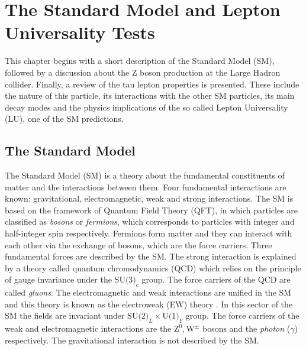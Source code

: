 \chapter{The Standard Model and Lepton Universality Tests}\label{chap:relatedwork}
This chapter begins with a short description of the Standard Model (SM), followed by a discussion about the Z boson production at the Large Hadron collider. Finally, a review of the tau lepton properties is presented. These include the nature of this particle, its interactions with the other SM particles, its main decay modes and the physics implications of the so called Lepton Universality (LU), one of the SM predictions.  
\section{The Standard Model}\label{chap2secm1}
The Standard Model (SM) is a theory about the fundamental constituents of matter and the interactions between them. Four fundamental interactions are known: gravitational, electromagnetic, weak and strong interactions. The SM is based on the framework of Quantum Field Theory (QFT), in which particles are classified as \textit{bosons} or \textit{fermions}, which corresponds to particles with integer and half-integer spin respectively. Fermions form matter and they can interact with each other via the exchange of bosons, which are the force carriers. Three fundamental forces are described by the SM. The strong interaction is explained by a theory called quantum chromodynamics (QCD) \cite{GellMann:1964nj} which relies on the principle of gauge invariance under the $\text{SU(3)}_c$ group. The force carriers of the QCD are called \textit{gluons}. The electromagnetic and weak interactions are unified in the SM and this theory is known as the electroweak (EW) theory \cite{Glashow:1967rx,Salam:1968rm,Weinberg:1967tq}. In this sector of the SM the fields are invariant under $\text{SU(2)}_L\times\text{U(1)}_Y$ group. The force carriers of the weak and electromagnetic interactions are the $\text{Z}^0,\text{W}^\pm$ bosons and the \textit{photon} ($\gamma$) respectively. The gravitational interaction is not described by the SM.
	
